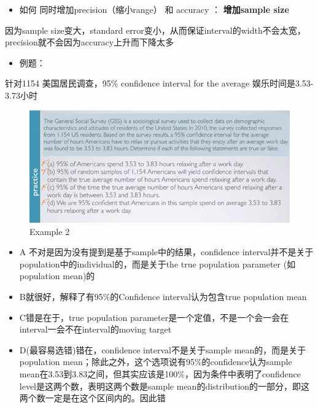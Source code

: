 \documentclass[]{book}
\providecommand{\tightlist}{%
  \setlength{\itemsep}{0pt}\setlength{\parskip}{0pt}}
\begin{document}
\begin{itemize}
\tightlist
\item
  如何 同时增加precision（缩小range） 和 accuracy ： \textbf{增加sample
  size}
\end{itemize}

因为sample size变大，standard
error变小，从而保证interval的width不会太宽，precision就不会因为accuracy上升而下降太多

\begin{itemize}
\tightlist
\item
  例题：
\end{itemize}

针对1154 美国居民调查，95\% confidence interval for the average
娱乐时间是3.53-3.73小时

\begin{figure}

{\centering \includegraphics[width=0.8\linewidth]{graphs/2-11} 

}

\caption{Example 2}\label{fig:fig2-11}
\end{figure}

\begin{itemize}
\tightlist
\item
  A 不对是因为没有提到是基于sample中的结果，confidence
  interval并不是关于population中的individual的，而是关于the true
  population parameter (如population mean)的
\item
  B就很好，解释了有95\%的Confidence interval认为包含true population mean
\item
  C错是在于，true population
  parameter是一个定值，不是一个会一会在interval一会不在interval的moving
  target
\item
  D(最容易选错)错在，confidence interval不是关于sample
  mean的，而是关于population
  mean；除此之外，这个选项说有95\%的confidence认为sample
  mean在3.53到3.83之间，但其实应该是100\%，因为条件中表明了confidence
  level是这两个数，表明这两个数是sample
  mean的distribution的一部分，即这两个数一定是在这个区间内的。因此错
\end{itemize}
\end{document}
